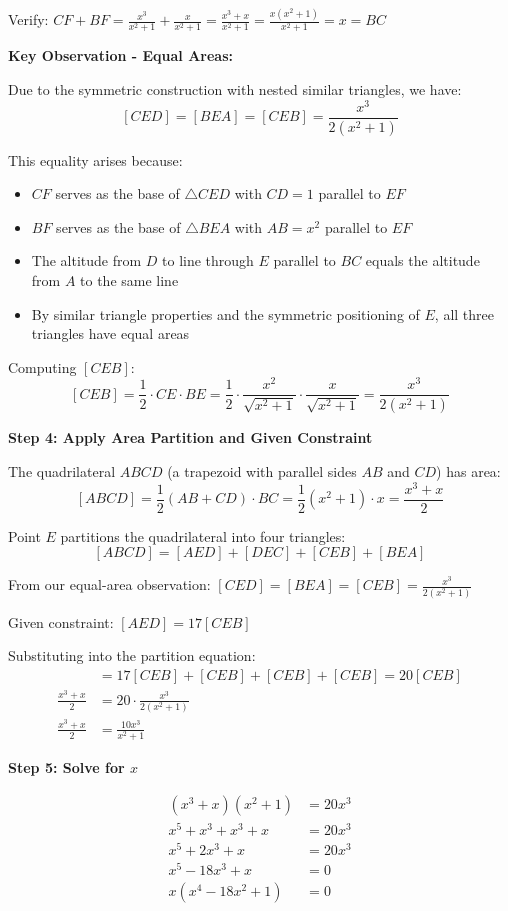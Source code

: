 \documentclass[]{article}
\begin{document}
\begin{solutionbox}
Verify: $CF + BF = \frac{x^3}{x^2+1} + \frac{x}{x^2+1} = \frac{x^3 + x}{x^2+1} = \frac{x(x^2+1)}{x^2+1} = x = BC$ \checkmark

\textbf{Key Observation - Equal Areas:}

Due to the symmetric construction with nested similar triangles, we have:
\[[CED] = [BEA] = [CEB] = \frac{x^3}{2(x^2+1)}\]

This equality arises because:
\begin{itemize}
    \item $CF$ serves as the base of $\triangle CED$ with $CD = 1$ parallel to $EF$
    \item $BF$ serves as the base of $\triangle BEA$ with $AB = x^2$ parallel to $EF$  
    \item The altitude from $D$ to line through $E$ parallel to $BC$ equals the altitude from $A$ to the same line
    \item By similar triangle properties and the symmetric positioning of $E$, all three triangles have equal areas
\end{itemize}

Computing $[CEB]$:
\[[CEB] = \frac{1}{2} \cdot CE \cdot BE = \frac{1}{2} \cdot \frac{x^2}{\sqrt{x^2+1}} \cdot \frac{x}{\sqrt{x^2+1}} = \frac{x^3}{2(x^2+1)}\]

\textbf{Step 4: Apply Area Partition and Given Constraint}

The quadrilateral $ABCD$ (a trapezoid with parallel sides $AB$ and $CD$) has area:
\[[ABCD] = \frac{1}{2}(AB + CD) \cdot BC = \frac{1}{2}(x^2 + 1) \cdot x = \frac{x^3 + x}{2}\]

Point $E$ partitions the quadrilateral into four triangles:
\[[ABCD] = [AED] + [DEC] + [CEB] + [BEA]\]

From our equal-area observation: $[CED] = [BEA] = [CEB] = \frac{x^3}{2(x^2+1)}$

Given constraint: $[AED] = 17[CEB]$

Substituting into the partition equation:
\begin{align*}
    [ABCD] &= 17[CEB] + [CEB] + [CEB] + [CEB] = 20[CEB] \\
    \frac{x^3 + x}{2} &= 20 \cdot \frac{x^3}{2(x^2+1)} \\
    \frac{x^3 + x}{2} &= \frac{10x^3}{x^2+1}
\end{align*}

\textbf{Step 5: Solve for $x$}

\begin{align*}
    (x^3 + x)(x^2 + 1) &= 20x^3 \\
    x^5 + x^3 + x^3 + x &= 20x^3 \\
    x^5 + 2x^3 + x &= 20x^3 \\
    x^5 - 18x^3 + x &= 0 \\
    x(x^4 - 18x^2 + 1) &= 0
\end{align*}


\end{solutionbox}
\end{document}
